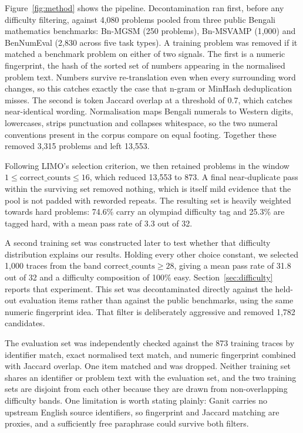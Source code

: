 \documentclass[10pt,twocolumn,letterpaper]{article}
\begin{document}
Figure~\ref{fig:method} shows the pipeline. Decontamination ran first, before
any difficulty filtering, against 4,080 problems pooled from three public
Bengali mathematics benchmarks: Bn-MGSM (250 problems), Bn-MSVAMP (1,000) and
BenNumEval (2,830 across five task types). A training problem was removed if it
matched a benchmark problem on either of two signals. The first is a numeric
fingerprint, the hash of the sorted set of numbers appearing in the normalised
problem text. Numbers survive re-translation even when every surrounding word
changes, so this catches exactly the case that n-gram or MinHash deduplication
misses. The second is token Jaccard overlap at a threshold of 0.7, which
catches near-identical wording. Normalisation maps Bengali numerals to Western
digits, lowercases, strips punctuation and collapses whitespace, so the two
numeral conventions present in the corpus compare on equal footing. Together
these removed 3,315 problems and left 13,553.

Following LIMO's selection criterion, we then retained problems in the window
$1 \leq \text{correct\_counts} \leq 16$, which reduced 13,553 to 873. A final
near-duplicate pass within the surviving set removed nothing, which is itself
mild evidence that the pool is not padded with reworded repeats. The resulting
set is heavily weighted towards hard problems: 74.6\% carry an olympiad
difficulty tag and 25.3\% are tagged hard, with a mean pass rate of 3.3 out of
32.

A second training set was constructed later to test whether that difficulty
distribution explains our results. Holding every other choice constant, we
selected 1,000 traces from the band $\text{correct\_counts} \geq 28$, giving a
mean pass rate of 31.8 out of 32 and a difficulty composition of 100\% easy.
Section~\ref{sec:difficulty} reports that experiment. This set was
decontaminated directly against the held-out evaluation items rather than
against the public benchmarks, using the same numeric fingerprint idea. That
filter is deliberately aggressive and removed 1,782 candidates.

The evaluation set was independently checked against the 873 training traces by
identifier match, exact normalised text match, and numeric fingerprint combined
with Jaccard overlap. One item matched and was dropped. Neither training set
shares an identifier or problem text with the evaluation set, and the two
training sets are disjoint from each other because they are drawn from
non-overlapping difficulty bands. One limitation is worth stating plainly:
Ganit carries no upstream English source identifiers, so fingerprint and
Jaccard matching are proxies, and a sufficiently free paraphrase could survive
both filters.
\end{document}
